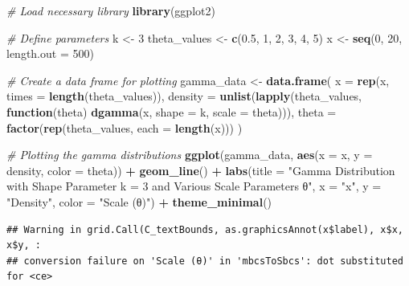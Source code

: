 \documentclass[
]{article}
\newenvironment{Shaded}{\begin{snugshade}}{\end{snugshade}}
\newcommand{\AttributeTok}[1]{\textcolor[rgb]{0.13,0.29,0.53}{#1}}
\newcommand{\CommentTok}[1]{\textcolor[rgb]{0.56,0.35,0.01}{\textit{#1}}}
\newcommand{\ControlFlowTok}[1]{\textcolor[rgb]{0.13,0.29,0.53}{\textbf{#1}}}
\newcommand{\DecValTok}[1]{\textcolor[rgb]{0.00,0.00,0.81}{#1}}
\newcommand{\FloatTok}[1]{\textcolor[rgb]{0.00,0.00,0.81}{#1}}
\newcommand{\FunctionTok}[1]{\textcolor[rgb]{0.13,0.29,0.53}{\textbf{#1}}}
\newcommand{\NormalTok}[1]{#1}
\newcommand{\OtherTok}[1]{\textcolor[rgb]{0.56,0.35,0.01}{#1}}
\newcommand{\SpecialCharTok}[1]{\textcolor[rgb]{0.81,0.36,0.00}{\textbf{#1}}}
\newcommand{\StringTok}[1]{\textcolor[rgb]{0.31,0.60,0.02}{#1}}
\begin{document}
\begin{Shaded}
\begin{Highlighting}[]
\CommentTok{\# Load necessary library}
\FunctionTok{library}\NormalTok{(ggplot2)}

\CommentTok{\# Define parameters}
\NormalTok{k }\OtherTok{\textless{}{-}} \DecValTok{3}
\NormalTok{theta\_values }\OtherTok{\textless{}{-}} \FunctionTok{c}\NormalTok{(}\FloatTok{0.5}\NormalTok{, }\DecValTok{1}\NormalTok{, }\DecValTok{2}\NormalTok{, }\DecValTok{3}\NormalTok{, }\DecValTok{4}\NormalTok{, }\DecValTok{5}\NormalTok{)}
\NormalTok{x }\OtherTok{\textless{}{-}} \FunctionTok{seq}\NormalTok{(}\DecValTok{0}\NormalTok{, }\DecValTok{20}\NormalTok{, }\AttributeTok{length.out =} \DecValTok{500}\NormalTok{)}

\CommentTok{\# Create a data frame for plotting}
\NormalTok{gamma\_data }\OtherTok{\textless{}{-}} \FunctionTok{data.frame}\NormalTok{(}
  \AttributeTok{x =} \FunctionTok{rep}\NormalTok{(x, }\AttributeTok{times =} \FunctionTok{length}\NormalTok{(theta\_values)),}
  \AttributeTok{density =} \FunctionTok{unlist}\NormalTok{(}\FunctionTok{lapply}\NormalTok{(theta\_values, }\ControlFlowTok{function}\NormalTok{(theta) }\FunctionTok{dgamma}\NormalTok{(x, }\AttributeTok{shape =}\NormalTok{ k, }\AttributeTok{scale =}\NormalTok{ theta))),}
  \AttributeTok{theta =} \FunctionTok{factor}\NormalTok{(}\FunctionTok{rep}\NormalTok{(theta\_values, }\AttributeTok{each =} \FunctionTok{length}\NormalTok{(x)))}
\NormalTok{)}

\CommentTok{\# Plotting the gamma distributions}
\FunctionTok{ggplot}\NormalTok{(gamma\_data, }\FunctionTok{aes}\NormalTok{(}\AttributeTok{x =}\NormalTok{ x, }\AttributeTok{y =}\NormalTok{ density, }\AttributeTok{color =}\NormalTok{ theta)) }\SpecialCharTok{+}
  \FunctionTok{geom\_line}\NormalTok{() }\SpecialCharTok{+}
  \FunctionTok{labs}\NormalTok{(}\AttributeTok{title =} \StringTok{"Gamma Distribution with Shape Parameter k = 3 and Various Scale Parameters θ"}\NormalTok{,}
       \AttributeTok{x =} \StringTok{"x"}\NormalTok{, }\AttributeTok{y =} \StringTok{"Density"}\NormalTok{, }\AttributeTok{color =} \StringTok{"Scale (θ)"}\NormalTok{) }\SpecialCharTok{+}
  \FunctionTok{theme\_minimal}\NormalTok{()}
\end{Highlighting}
\end{Shaded}

\begin{verbatim}
## Warning in grid.Call(C_textBounds, as.graphicsAnnot(x$label), x$x, x$y, :
## conversion failure on 'Scale (θ)' in 'mbcsToSbcs': dot substituted for <ce>
\end{verbatim}
\end{document}
